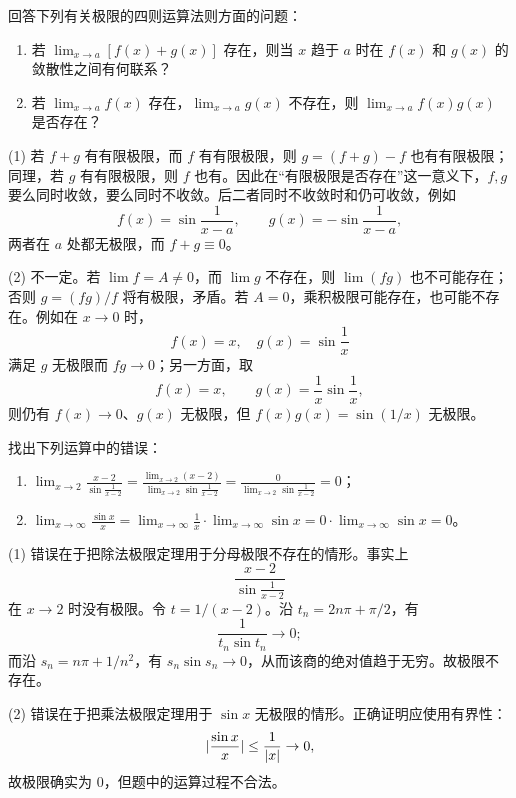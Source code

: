 \begin{xthought}[2]
回答下列有关极限的四则运算法则方面的问题：
  \begin{enumerate}
    \item 若 $\lim_{x\to a}[f(x)+g(x)]$ 存在，则当 $x$ 趋于 $a$ 时在 $f(x)$ 和 $g(x)$ 的敛散性之间有何联系？
    \item 若 $\lim_{x\to a}f(x)$ 存在，$\lim_{x\to a}g(x)$ 不存在，则 $\lim_{x\to a}f(x)g(x)$ 是否存在？
  \end{enumerate}
\end{xthought}
\begin{xsolution}
(1) 若 $f+g$ 有有限极限，而 $f$ 有有限极限，则
$g=(f+g)-f$ 也有有限极限；同理，若 $g$ 有有限极限，则 $f$ 也有。因此在“有限极限是否存在”这一意义下，$f,g$ 要么同时收敛，要么同时不收敛。后二者同时不收敛时和仍可收敛，例如
\[
  f(x)=\sin\frac1{x-a},\qquad g(x)=-\sin\frac1{x-a},
\]
两者在 $a$ 处都无极限，而 $f+g\equiv0$。

(2) 不一定。若 $\lim f=A\ne0$，而 $\lim g$ 不存在，则 $\lim(fg)$ 也不可能存在；否则
$g=(fg)/f$ 将有极限，矛盾。若 $A=0$，乘积极限可能存在，也可能不存在。例如在 $x\to0$ 时，
\[
  f(x)=x,\quad g(x)=\sin\frac1x
\]
满足 $g$ 无极限而 $fg\to0$；另一方面，取
\[
  f(x)=x,\qquad g(x)=\frac1x\sin\frac1x,
\]
则仍有 $f(x)\to0$、$g(x)$ 无极限，但 $f(x)g(x)=\sin(1/x)$ 无极限。
\end{xsolution}


\begin{xthought}[3]
找出下列运算中的错误：
  \begin{enumerate}
    \item $\displaystyle\lim_{x\to2}\frac{x-2}{\sin\frac1{x-2}}
    =\frac{\lim_{x\to2}(x-2)}{\lim_{x\to2}\sin\frac1{x-2}}
    =\frac0{\lim_{x\to2}\sin\frac1{x-2}}=0$；
    \item $\displaystyle\lim_{x\to\infty}\frac{\sin x}{x}
    =\lim_{x\to\infty}\frac1x\cdot\lim_{x\to\infty}\sin x
    =0\cdot\lim_{x\to\infty}\sin x=0$。
  \end{enumerate}
\end{xthought}
\begin{xsolution}
(1) 错误在于把除法极限定理用于分母极限不存在的情形。事实上
\[
  \frac{x-2}{\sin\frac1{x-2}}
\]
在 $x\to2$ 时没有极限。令 $t=1/(x-2)$。沿 $t_n=2n\pi+\pi/2$，有
\[
  \frac1{t_n\sin t_n}\to0;
\]
而沿 $s_n=n\pi+1/n^2$，有
$s_n\sin s_n\to0$，从而该商的绝对值趋于无穷。故极限不存在。

(2) 错误在于把乘法极限定理用于 $\sin x$ 无极限的情形。正确证明应使用有界性：
\[
  \lvert\frac{\sin x}{x}\rvert\leq\frac1{\lvert x\rvert}\to0,
\]
故极限确实为 0，但题中的运算过程不合法。
\end{xsolution}


